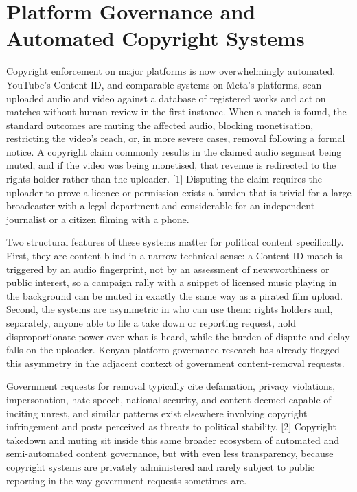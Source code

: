 \documentclass{article}
\begin{document}
\section{Platform Governance and Automated Copyright Systems}
\par
Copyright enforcement on major platforms is now overwhelmingly automated. YouTube’s Content ID, and comparable systems on Meta’s platforms, scan uploaded audio and video against a database of registered works and act on matches without human review in the first instance. When a match is found, the standard outcomes are muting the affected audio, blocking monetisation, restricting the video’s reach, or, in more severe cases, removal following a formal notice. A copyright claim commonly results in the claimed audio segment being muted, and if the video was being monetised, that revenue is redirected to the rights holder rather than the uploader. [1] Disputing the claim requires the uploader to prove a licence or permission exists a burden that is trivial for a large broadcaster with a legal department and considerable for an independent journalist or a citizen filming with a phone.
\par 
Two structural features of these systems matter for political content specifically. First, they are content-blind in a narrow technical sense: a Content ID match is triggered by an audio fingerprint, not by an assessment of newsworthiness or public interest, so a campaign rally with a snippet of licensed music playing in the background can be muted in exactly the same way as a pirated film upload. Second, the systems are asymmetric in who can use them: rights holders and, separately, anyone able to file a take down or reporting request, hold disproportionate power over what is heard, while the burden of dispute and delay falls on the uploader. Kenyan platform governance research has already flagged this asymmetry in the adjacent context of government content-removal requests.\par Government requests for removal typically cite defamation, privacy violations, impersonation, hate speech, national security, and content deemed capable of inciting unrest, and similar patterns exist elsewhere involving copyright infringement and posts perceived as threats to political stability. [2] Copyright takedown and muting sit inside this same broader ecosystem of automated and semi-automated content governance, but with even less transparency, because copyright systems are privately administered and rarely subject to public reporting in the way government requests sometimes are.
\end{document}
